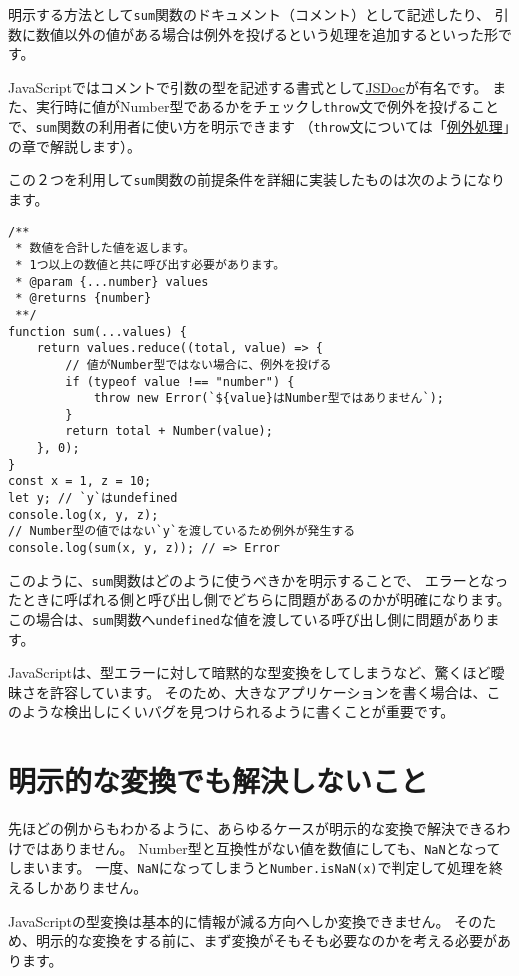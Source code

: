 明示する方法として\texttt{sum}関数のドキュメント（コメント）として記述したり、
引数に数値以外の値がある場合は例外を投げるという処理を追加するといった形です。

JavaScriptではコメントで引数の型を記述する書式として\href{http://usejsdoc.org/}{JSDoc}が有名です。
また、実行時に値がNumber型であるかをチェックし\texttt{throw}文で例外を投げることで、\texttt{sum}関数の利用者に使い方を明示できます
（\texttt{throw}文については「\href{../error-try-catch/README.md}{例外処理}」の章で解説します）。

この２つを利用して\texttt{sum}関数の前提条件を詳細に実装したものは次のようになります。

\begin{lstlisting}
/**
 * 数値を合計した値を返します。
 * 1つ以上の数値と共に呼び出す必要があります。
 * @param {...number} values
 * @returns {number}
 **/
function sum(...values) {
    return values.reduce((total, value) => {
        // 値がNumber型ではない場合に、例外を投げる
        if (typeof value !== "number") {
            throw new Error(`${value}はNumber型ではありません`);
        }
        return total + Number(value);
    }, 0);
}
const x = 1, z = 10;
let y; // `y`はundefined
console.log(x, y, z);
// Number型の値ではない`y`を渡しているため例外が発生する
console.log(sum(x, y, z)); // => Error
\end{lstlisting}

このように、\texttt{sum}関数はどのように使うべきかを明示することで、
エラーとなったときに呼ばれる側と呼び出し側でどちらに問題があるのかが明確になります。
この場合は、\texttt{sum}関数へ\texttt{undefined}な値を渡している呼び出し側に問題があります。

JavaScriptは、型エラーに対して暗黙的な型変換をしてしまうなど、驚くほど曖昧さを許容しています。
そのため、大きなアプリケーションを書く場合は、このような検出しにくいバグを見つけられるように書くことが重要です。

\hypertarget{unsolved-problem}{%
\section{明示的な変換でも解決しないこと}\label{unsolved-problem}}

先ほどの例からもわかるように、あらゆるケースが明示的な変換で解決できるわけではありません。
Number型と互換性がない値を数値にしても、\texttt{NaN}となってしまいます。
一度、\texttt{NaN}になってしまうと\texttt{Number.isNaN(x)}で判定して処理を終えるしかありません。

JavaScriptの型変換は基本的に情報が減る方向へしか変換できません。
そのため、明示的な変換をする前に、まず変換がそもそも必要なのかを考える必要があります。


